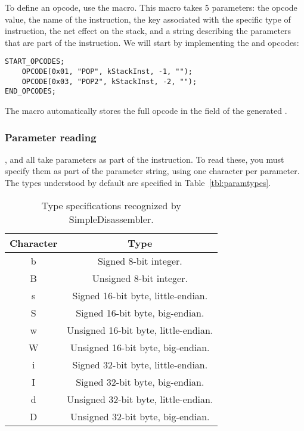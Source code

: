 To define an opcode, use the  macro. This macro takes 5 parameters: the opcode value, the name of the instruction, the key associated with the specific type of instruction, the net effect on the stack, and a string describing the parameters that are part of the instruction. We will start by implementing the  and  opcodes:

\begin{C++}
\begin{lstlisting}
START_OPCODES;
	OPCODE(0x01, "POP", kStackInst, -1, "");
	OPCODE(0x03, "POP2", kStackInst, -2, "");
END_OPCODES;
\end{lstlisting}
\end{C++}

The  macro automatically stores the full opcode in the  field of the generated .

\subsubsection{Parameter reading}
,  and  all take parameters as part of the instruction. To read these, you must specify them as part of the parameter string, using one character per parameter. The types understood by default are specified in Table~\vref{tbl:paramtypes}.

\begin{table}[!hpbt]
\centering
\begin{tabular}{c | c}
Character & Type \\
\hline
b & Signed 8-bit integer. \\
B & Unsigned 8-bit integer. \\
s & Signed 16-bit byte, little-endian. \\
S & Signed 16-bit byte, big-endian. \\
w & Unsigned 16-bit byte, little-endian. \\
W & Unsigned 16-bit byte, big-endian. \\
i & Signed 32-bit byte, little-endian. \\
I & Signed 32-bit byte, big-endian. \\
d & Unsigned 32-bit byte, little-endian. \\
D & Unsigned 32-bit byte, big-endian. \\
\end{tabular}
\caption{Type specifications recognized by SimpleDisassembler.}
\label{tbl:paramtypes}
\end{table}

